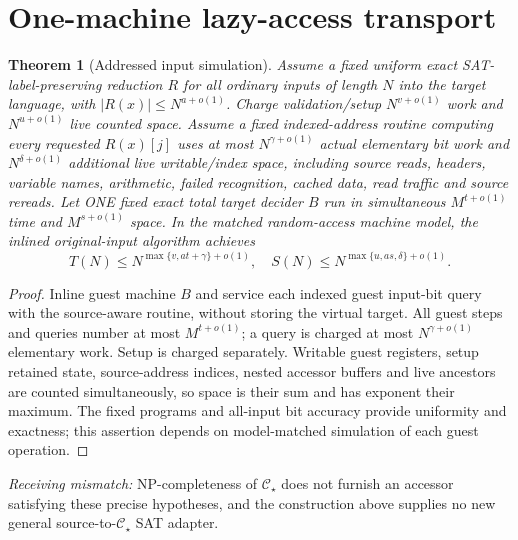 \documentclass[11pt]{article}
\newtheorem{theorem}{Theorem}
\newcommand{\CS}{\mathcal C_\star}
\begin{document}
\section{One-machine lazy-access transport}
\begin{theorem}[Addressed input simulation]
Assume a fixed uniform exact SAT-label-preserving reduction $R$ for
all ordinary inputs of length $N$ into the target language, with
$|R(x)|\le N^{a+o(1)}$. Charge validation/setup
$N^{v+o(1)}$ work and $N^{u+o(1)}$ live counted space. Assume a fixed
indexed-address routine computing every requested $R(x)[j]$ uses
at most $N^{\gamma+o(1)}$ actual elementary bit work and
$N^{\delta+o(1)}$ additional live writable/index space, including
source reads, headers, variable names, arithmetic, failed recognition,
cached data, read traffic and source rereads. Let ONE fixed exact total
target decider $B$ run in simultaneous $M^{t+o(1)}$ time and
$M^{s+o(1)}$ space. In the matched random-access machine model,
the inlined original-input algorithm achieves
\[
 \boxed{T(N)\le N^{\max\{v,at+\gamma\}+o(1)},\quad
 S(N)\le N^{\max\{u,as,\delta\}+o(1)}.}\tag{1}
\]
\end{theorem}
\begin{proof}
Inline guest machine $B$ and service each indexed guest input-bit query
with the source-aware routine, without storing the virtual target.
All guest steps and queries number at most $M^{t+o(1)}$; a query
is charged at most $N^{\gamma+o(1)}$ elementary work. Setup is
charged separately. Writable guest registers, setup retained state,
source-address indices, nested accessor buffers and live ancestors
are counted simultaneously, so space is their sum and has exponent
their maximum. The fixed programs and all-input bit accuracy provide
uniformity and exactness; this assertion depends on model-matched
simulation of each guest operation.
\end{proof}
\emph{Receiving mismatch:} NP-completeness of $\CS$ does not furnish
an accessor satisfying these precise hypotheses, and the construction
above supplies no new general source-to-$\CS$ SAT adapter.
\end{document}
